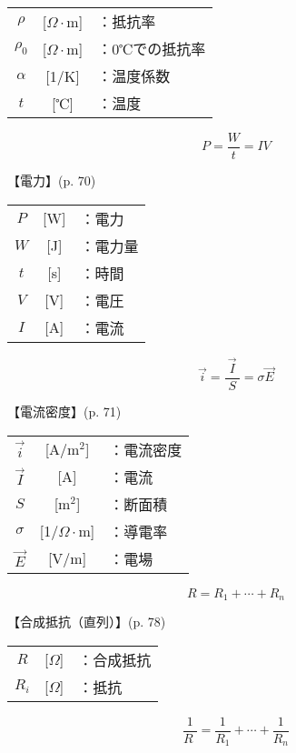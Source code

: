\documentclass[10pt]{jarticle}
\begin{document}
\begin{tabular}{ccl}
$\rho$	&[$\Omega \cdot $m]	&：抵抗率\\
$\rho_0$	&[$\Omega \cdot $m]	&：0℃での抵抗率\\
$\alpha$	&[1/K]	&：温度係数\\
$t$	&[℃]	&：温度
\end{tabular}





\newpage
\[
P = \frac{W}{t} = I V
\]


\vskip3mm
【電力】{\footnotesize (p. 70)}

\begin{tabular}{ccl}
$P$	&[W]	&：電力\\
$W$	& [J]	&：電力量\\
$t$	& [s]	&：時間\\
$V$	& [V]	&：電圧\\
$I$	&[A]	&：電流
\end{tabular}


\newpage
\[
\vec{i} = \frac{\vec{I}}{\; S \;} = \sigma \vec{E}
\]


\vskip3mm
【電流密度】{\footnotesize (p. 71)}

\begin{tabular}{ccl}
$\vec{i}$	&[A/m$^2$]	&：電流密度\\
$\vec{I}$	&[A]	&：電流\\
$S$	&[m$^2$]	&：断面積\\
$\sigma$	& [1/$\Omega \cdot$m]	&：導電率\\
$\vec{E}$	& [V/m]	&：電場
\end{tabular}





\newpage
\[
R = R_1 + \cdots + R_n
\]


\vskip3mm
【合成抵抗（直列）】{\footnotesize (p. 78)}

\begin{tabular}{ccl}
$R$	&[$\Omega$]	&：合成抵抗 \\
$R_i$	&[$\Omega$]	&：抵抗 \\
\end{tabular}





\newpage
\[
\frac{1}{R \;} = \frac{1}{R_1} + \cdots + \frac{1}{R_n}
\]
\end{document}
